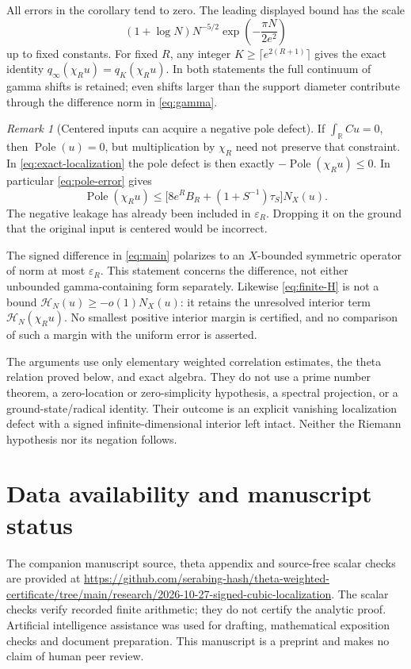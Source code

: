 \documentclass[11pt]{article}
\theoremstyle{remark}\newtheorem{remark}[theorem]{Remark}
\newcommand{\R}{\mathbb R}
\newcommand{\Pole}{\operatorname{Pole}}
\newcommand{\HH}{\mathcal H}
\numberwithin{equation}{section}
\begin{document}
All errors in the corollary tend to zero. The leading displayed bound has
the scale
\[
 (1+\log N)N^{-5/2}\exp\left(-\frac{\pi N}{2e^2}\right)
\]
up to fixed constants. For fixed $R$, any integer
$K\ge\lceil e^{2(R+1)}\rceil$ gives the exact identity
$q_\infty(\chi_Ru)=q_K(\chi_Ru)$. In both statements the full continuum
of gamma shifts is retained; even shifts larger than the support diameter
contribute through the difference norm in \eqref{eq:gamma}.

\begin{remark}[Centered inputs can acquire a negative pole defect]
If $\int_\R Cu=0$, then $\Pole(u)=0$, but multiplication by $\chi_R$
need not preserve that constraint. In \eqref{eq:exact-localization} the
pole defect is then exactly $-\Pole(\chi_Ru)\le0$. In particular
\eqref{eq:pole-error} gives
\[
 \Pole(\chi_Ru)\le
 \bigl[8e^RB_R+(1+S^{-1})\tau_S\bigr]N_X(u).
\]
The negative leakage has already been included in $\varepsilon_R$.
Dropping it on the ground that the original input is centered would be
incorrect.
\end{remark}

The signed difference in \eqref{eq:main} polarizes to an $X$-bounded
symmetric operator of norm at most $\varepsilon_R$. This statement concerns
the difference, not either unbounded gamma-containing form separately.
Likewise \eqref{eq:finite-H} is not a bound
$\HH_N(u)\ge-o(1)N_X(u)$: it retains the unresolved interior term
$\HH_N(\chi_Ru)$. No smallest positive interior margin is certified,
and no comparison of such a margin with the uniform error is asserted.

The arguments use only elementary weighted correlation estimates,
the theta relation proved below, and exact algebra. They do not use a
prime number theorem, a zero-location or zero-simplicity hypothesis,
a spectral projection, or a ground-state/radical identity. Their outcome
is an explicit vanishing localization defect with a signed
infinite-dimensional interior left intact. Neither the Riemann hypothesis
nor its negation follows.

\appendix

\section*{Data availability and manuscript status}
The companion manuscript source, theta appendix and source-free scalar
checks are provided at
\url{https://github.com/serabing-hash/theta-weighted-certificate/tree/main/research/2026-10-27-signed-cubic-localization}.
The scalar checks verify recorded finite arithmetic; they do not certify
the analytic proof. Artificial intelligence assistance was used for
drafting, mathematical exposition checks and document preparation.
This manuscript is a preprint and makes no claim of human peer review.
\end{document}
